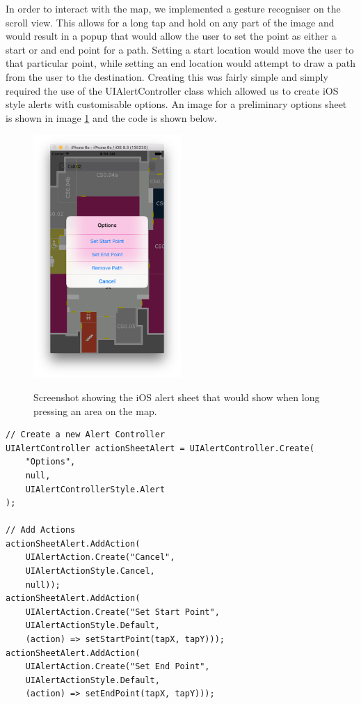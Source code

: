 \documentclass[12pt,a4paper]{report}
\begin{document}
In order to interact with the map, we implemented a gesture recogniser on the scroll view. This allows for a long tap and hold on any part of the image and would result in a popup that would allow the user to set the point as either a start or and end point for a path. Setting a start location would move the user to that particular point, while setting an end location would attempt to draw a path from the user to the destination. Creating this was fairly simple and simply required the use of the UIAlertController class which allowed us to create iOS style alerts with customisable options. An image for a preliminary options sheet is shown in image \ref{IOSAlertSheet} and the code is shown below.

\begin{figure}[]
\centering
\includegraphics[width=0.5\textwidth]{images-implementation/IOSAlertSheet.png}
\label{IOSAlertSheet}
\caption{Screenshot showing the iOS alert sheet that would show when long pressing an area on the map.}
\end{figure}

\begin{lstlisting}
// Create a new Alert Controller
UIAlertController actionSheetAlert = UIAlertController.Create(
	"Options", 
	null, 
	UIAlertControllerStyle.Alert
);

// Add Actions
actionSheetAlert.AddAction(
	UIAlertAction.Create("Cancel",
	UIAlertActionStyle.Cancel, 
	null));
actionSheetAlert.AddAction(
	UIAlertAction.Create("Set Start Point",
	UIAlertActionStyle.Default, 
	(action) => setStartPoint(tapX, tapY)));
actionSheetAlert.AddAction(
	UIAlertAction.Create("Set End Point",
	UIAlertActionStyle.Default, 
	(action) => setEndPoint(tapX, tapY)));
\end{lstlisting}
\end{document}
